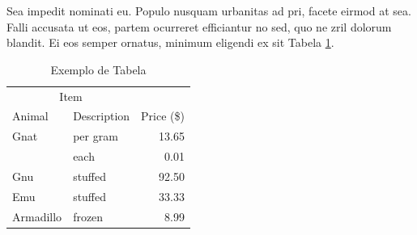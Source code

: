 	Sea impedit nominati eu. Populo nusquam urbanitas ad pri, facete eirmod at sea. Falli accusata ut eos, partem ocurreret efficiantur no sed, quo ne zril dolorum blandit. Ei eos semper ornatus, minimum eligendi ex sit Tabela \ref{tab:exemplo_tabela}.

	\begin{table}[h]
		\centering
		\caption{Exemplo de Tabela}
		\label{tab:exemplo_tabela}
		\begin{tabular}{llr}
		\hline
		\multicolumn{2}{c}{Item} 	&				\\ \cline{1-2}
		Animal	 					& Description 	& Price (\$) 	\\ \hline
		Gnat	   					& per gram		& 13.65	  		\\
									& each			& 0.01	   		\\
		Gnu							& stuffed	 	& 92.50	  		\\
		Emu							& stuffed	 	& 33.33	  		\\
		Armadillo  & frozen	  		& 8.99	   		\\ \hline
		\end{tabular}
	\end{table}
